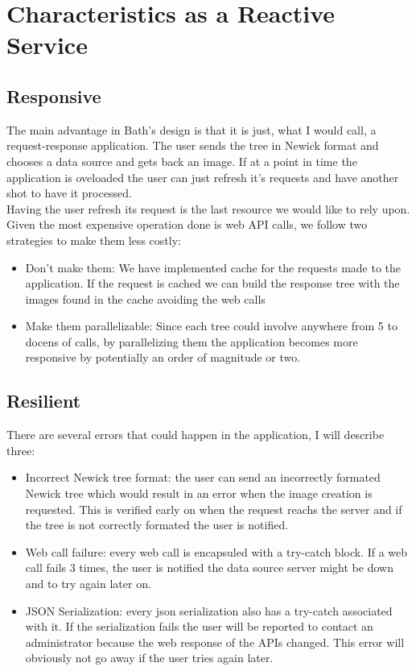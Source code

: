\documentclass[10pt]{article}
\begin{document}
\section{Characteristics as a Reactive Service}
 \subsection{Responsive}
 	The main advantage in Bath's design is that it is just, what I would call, a request-response application. The user sends the tree in Newick format and chooses a data source and gets back an image. If at a point in time the application is oveloaded the user can just refresh it's requests and have another shot to have it processed.\\
 	
 	Having the user refresh its request is the last resource we would like to rely upon. Given the most expensive operation done is web API calls, we follow two strategies to make them less costly:\\
 	
 	\begin{itemize}
  		\item Don't make them: We have implemented cache for the requests made to the application. If the request is cached we can build the response tree with the images found in the cache avoiding the web calls
  		\item Make them parallelizable: Since each tree could involve anywhere from 5 to docens of calls, by parallelizing them the application becomes more responsive by potentially an order of magnitude or two.
	\end{itemize}
 	
 \subsection{Resilient}
 	There are several errors that could happen in the application, I will describe three:\\
 	
 	\begin{itemize}
  		\item Incorrect Newick tree format: the user can send an incorrectly formated Newick tree which would result in an error when the image creation is requested. This is verified early on when the request reachs the server and if the tree is not correctly formated the user is notified.
  		\item Web call failure: every web call is encapsuled with a try-catch block. If a web call fails 3 times, the user is notified the data source server might be down and to try again later on.
  		\item JSON Serialization: every json serialization also has a try-catch associated with it. If the serialization fails the user will be reported to contact an administrator because the web response of the APIs changed. This error will obviously not go away if the user tries again later.
	\end{itemize}
 	
\end{document}
